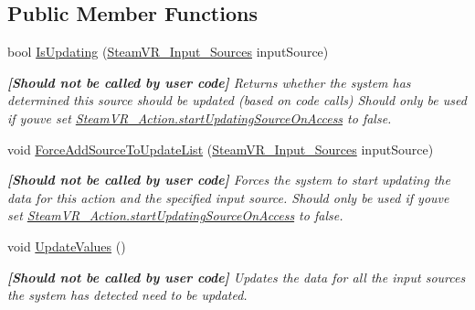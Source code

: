 \subsection*{Public Member Functions}
\begin{DoxyCompactItemize}
\item 
bool \mbox{\hyperlink{class_valve_1_1_v_r_1_1_steam_v_r___action___in___source___map_a4a43cc63a6c174a32dc8e55fd322c4c3}{Is\+Updating}} (\mbox{\hyperlink{namespace_valve_1_1_v_r_a82e5bf501cc3aa155444ee3f0662853f}{Steam\+V\+R\+\_\+\+Input\+\_\+\+Sources}} input\+Source)
\begin{DoxyCompactList}\small\item\em {\bfseries{\mbox{[}Should not be called by user code\mbox{]}}} Returns whether the system has determined this source should be updated (based on code calls) Should only be used if you\textquotesingle{}ve set \mbox{\hyperlink{class_valve_1_1_v_r_1_1_steam_v_r___action_ae27e9858dec18a4307cca7779ed87ad8}{Steam\+V\+R\+\_\+\+Action.\+start\+Updating\+Source\+On\+Access}} to false. \end{DoxyCompactList}\item 
void \mbox{\hyperlink{class_valve_1_1_v_r_1_1_steam_v_r___action___in___source___map_aac97f8b8dacc8bb475ce3d055df94b9a}{Force\+Add\+Source\+To\+Update\+List}} (\mbox{\hyperlink{namespace_valve_1_1_v_r_a82e5bf501cc3aa155444ee3f0662853f}{Steam\+V\+R\+\_\+\+Input\+\_\+\+Sources}} input\+Source)
\begin{DoxyCompactList}\small\item\em {\bfseries{\mbox{[}Should not be called by user code\mbox{]}}} Forces the system to start updating the data for this action and the specified input source. Should only be used if you\textquotesingle{}ve set \mbox{\hyperlink{class_valve_1_1_v_r_1_1_steam_v_r___action_ae27e9858dec18a4307cca7779ed87ad8}{Steam\+V\+R\+\_\+\+Action.\+start\+Updating\+Source\+On\+Access}} to false. \end{DoxyCompactList}\item 
void \mbox{\hyperlink{class_valve_1_1_v_r_1_1_steam_v_r___action___in___source___map_a0ab9b659a3dbb75ea0dfd1ef8e925895}{Update\+Values}} ()
\begin{DoxyCompactList}\small\item\em {\bfseries{\mbox{[}Should not be called by user code\mbox{]}}} Updates the data for all the input sources the system has detected need to be updated. \end{DoxyCompactList}\end{DoxyCompactItemize}
